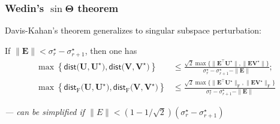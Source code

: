 \documentclass[compress,
mathserif,wide,%
]{beamer}
\begin{document}
\begin{frame}
\frametitle{Wedin's $\sin\bm{\Theta}$ theorem}


Davis-Kahan's theorem generalizes to singular subspace perturbation:

\vfill
\begin{theorem}
\label{thm:wedin} If $\|\bm{E}\|<\sigma_{r}^{\star}-\sigma_{r+1}^{\star}$, then one has
%
\begin{align*}
\max\left\{ \mathsf{dist}\big(\bm{U},\bm{U}^{\star}\big),\mathsf{dist}\big(\bm{V},\bm{V}^{\star}\big)\right\}
	& \leq\frac{ \sqrt{2} \max\big\{ \|\bm{E}^{\top}\bm{U}^{\star}\|,\|\bm{E}\bm{V}^{\star}\|\big\} }{\sigma_{r}^{\star}-\sigma_{r+1}^{\star}-\|\bm{E}\|};\\
\max\left\{ \mathsf{dist}_{\mathrm{F}}\big(\bm{U},\bm{U}^{\star}\big),\mathsf{dist}_{\mathrm{F}}\big(\bm{V},\bm{V}^{\star}\big)\right\}
	& \leq\frac{\sqrt{2}\max\big\{ \|\bm{E}^{\top}\bm{U}^{\star}\|_{\mathrm{F}},\|\bm{E}\bm{V}^{\star}\|_{\mathrm{F}}\big\} }{\sigma_{r}^{\star}-\sigma_{r+1}^{\star}-\|\bm{E}\|}
\end{align*}

\end{theorem}

\hfill \small \em --- can be simplified if $\|E\| < (1 - 1/\sqrt{2})(\sigma_{r}^{\star}-\sigma_{r+1}^{\star})$
\end{frame}
\end{document}
